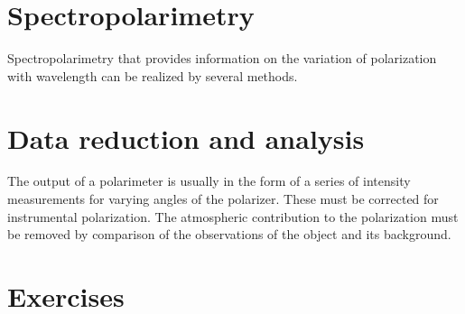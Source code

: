 \section{Spectropolarimetry}

Spectropolarimetry that provides information on the variation of polarization with wavelength can be realized by several methods. 

\section{Data reduction and analysis}

The output of a polarimeter is usually in the form of a series of
intensity measurements for varying angles of the polarizer. These must
be corrected for instrumental polarization. The atmospheric
contribution to the polarization must be removed by comparison of the
observations of the object  and its background. 

\section{Exercises}

